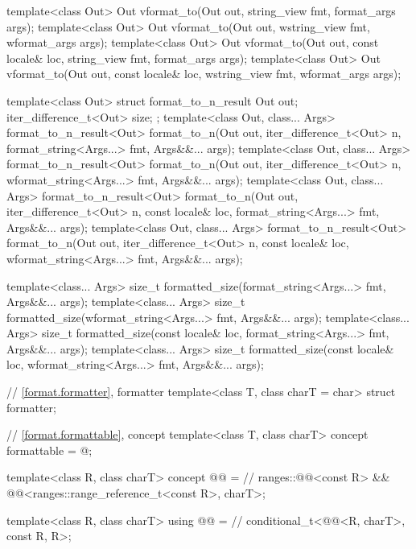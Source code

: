 \begin{codeblock}
{  template<class Out>
    Out vformat_to(Out out, string_view fmt, format_args args);
  template<class Out>
    Out vformat_to(Out out, wstring_view fmt, wformat_args args);
  template<class Out>
    Out vformat_to(Out out, const locale& loc, string_view fmt, format_args args);
  template<class Out>
    Out vformat_to(Out out, const locale& loc, wstring_view fmt, wformat_args args);

  template<class Out> struct format_to_n_result {
    Out out;
    iter_difference_t<Out> size;
  };
  template<class Out, class... Args>
    format_to_n_result<Out> format_to_n(Out out, iter_difference_t<Out> n,
                                        format_string<Args...> fmt, Args&&... args);
  template<class Out, class... Args>
    format_to_n_result<Out> format_to_n(Out out, iter_difference_t<Out> n,
                                        wformat_string<Args...> fmt, Args&&... args);
  template<class Out, class... Args>
    format_to_n_result<Out> format_to_n(Out out, iter_difference_t<Out> n,
                                        const locale& loc, format_string<Args...> fmt,
                                        Args&&... args);
  template<class Out, class... Args>
    format_to_n_result<Out> format_to_n(Out out, iter_difference_t<Out> n,
                                        const locale& loc, wformat_string<Args...> fmt,
                                        Args&&... args);

  template<class... Args>
    size_t formatted_size(format_string<Args...> fmt, Args&&... args);
  template<class... Args>
    size_t formatted_size(wformat_string<Args...> fmt, Args&&... args);
  template<class... Args>
    size_t formatted_size(const locale& loc, format_string<Args...> fmt, Args&&... args);
  template<class... Args>
    size_t formatted_size(const locale& loc, wformat_string<Args...> fmt, Args&&... args);

  // \ref{format.formatter}, formatter
  template<class T, class charT = char> struct formatter;

  // \ref{format.formattable}, concept 
  template<class T, class charT>
    concept formattable = @\seebelow@;

  template<class R, class charT>
    concept @@ =                                   // \expos
      ranges::@@<const R> &&
      @@<ranges::range_reference_t<const R>, charT>;

  template<class R, class charT>
    using @@ =                                             // \expos
      conditional_t<@@<R, charT>, const R, R>;

}
\end{codeblock}
